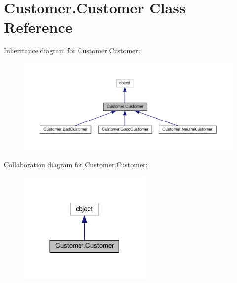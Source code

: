 \hypertarget{class_customer_1_1_customer}{}\section{Customer.\+Customer Class Reference}
\label{class_customer_1_1_customer}


Inheritance diagram for Customer.\+Customer\+:\nopagebreak
\begin{figure}[H]
\begin{center}
\leavevmode
\includegraphics[width=350pt]{class_customer_1_1_customer__inherit__graph}
\end{center}
\end{figure}


Collaboration diagram for Customer.\+Customer\+:\nopagebreak
\begin{figure}[H]
\begin{center}
\leavevmode
\includegraphics[width=185pt]{class_customer_1_1_customer__coll__graph}
\end{center}
\end{figure}
